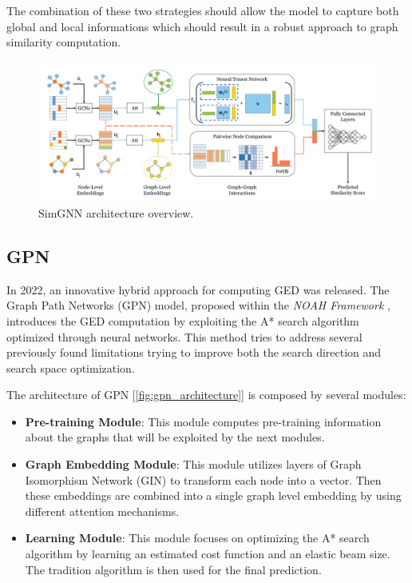 \documentclass[../Thesis.tex]{subfiles}
\begin{document}
	The combination of these two strategies should allow the model to capture both global and local informations which should result in a robust approach to graph similarity computation.
	
	\begin{figure}[H]
		\centering
		\includegraphics[width=\textwidth]{Images/simgnn_architecture.png}
		\caption{SimGNN architecture overview.}
		\label{fig:simgnn_architecture}
	\end{figure}

	
	\subsection{GPN}
	
	In 2022, an innovative hybrid approach for computing GED was released.
	The Graph Path Networks (GPN) model, proposed within the \textit{NOAH Framework} \cite{noah__neural_optimized_a*_search_algorithm_for_graph_edit_distance_computation}, introduces the GED computation by exploiting the A* search algorithm optimized through neural networks. This method tries to address several previously found limitations trying to improve both the search direction and search space optimization.
	
	The architecture of GPN [\autoref{fig:gpn_architecture}] is composed by several modules:
	
	\begin{itemize}
		\item \textbf{Pre-training Module}: This module computes pre-training information about the graphs that will be exploited by the next modules.
		\item \textbf{Graph Embedding Module}: This module utilizes layers of Graph Isomorphism Network (GIN) to transform each node into a vector. Then these embeddings are combined into a single graph level embedding by using different attention mechanisms.
		\item \textbf{Learning Module}: This module focuses on optimizing the A* search algorithm by learning an estimated cost function and an elastic beam size. The tradition algorithm is then used for the final prediction.
	\end{itemize}
	
\end{document}
